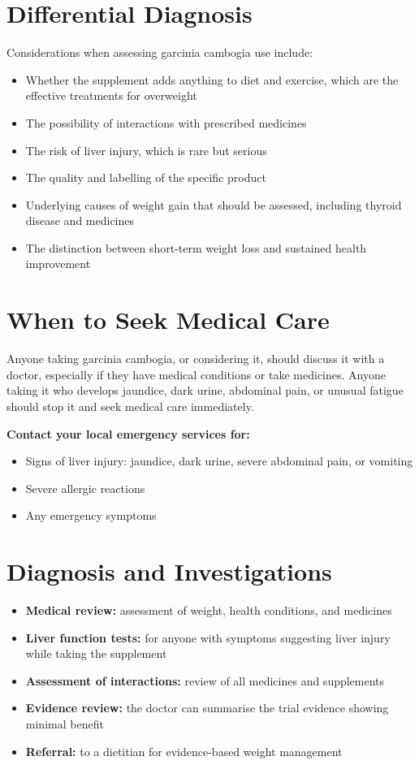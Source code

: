 \section*{Differential Diagnosis}
Considerations when assessing garcinia cambogia use include:
\begin{itemize}
    \item Whether the supplement adds anything to diet and exercise, which are the effective treatments for overweight
    \item The possibility of interactions with prescribed medicines
    \item The risk of liver injury, which is rare but serious
    \item The quality and labelling of the specific product
    \item Underlying causes of weight gain that should be assessed, including thyroid disease and medicines
    \item The distinction between short-term weight loss and sustained health improvement
\end{itemize}

\section*{When to Seek Medical Care}
Anyone taking garcinia cambogia, or considering it, should discuss it with a doctor, especially if they have medical conditions or take medicines. Anyone taking it who develops jaundice, dark urine, abdominal pain, or unusual fatigue should stop it and seek medical care immediately.

\textbf{Contact your local emergency services for:}
\begin{itemize}
    \item Signs of liver injury: jaundice, dark urine, severe abdominal pain, or vomiting
    \item Severe allergic reactions
    \item Any emergency symptoms
\end{itemize}

\section*{Diagnosis and Investigations}
\begin{itemize}
    \item \textbf{Medical review:} assessment of weight, health conditions, and medicines
    \item \textbf{Liver function tests:} for anyone with symptoms suggesting liver injury while taking the supplement
    \item \textbf{Assessment of interactions:} review of all medicines and supplements
    \item \textbf{Evidence review:} the doctor can summarise the trial evidence showing minimal benefit
    \item \textbf{Referral:} to a dietitian for evidence-based weight management
\end{itemize}

